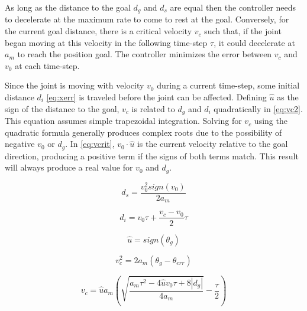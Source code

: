 As long as the distance to the goal $d_g$ and $d_s$ are equal 
then the controller needs to decelerate at the maximum rate to come to rest at the goal.
Conversely, for the current goal distance, there is a critical velocity $v_c$
such that, if the joint began moving at this velocity in the following
time-step $\tau$, it could decelerate at $a_m$ to reach the position goal.
The controller minimizes the error between $v_c$ and $v_0$ at each time-step.

Since the joint is moving with velocity $v_0$ during a current time-step, some
initial distance $d_{i}$ \eqref{eq:xerr} is traveled before the joint can be
affected. Defining $\hat{u}$ as the sign of the distance to the goal, $v_c$ is
related to $d_g$ and $d_i$ quadratically in \eqref{eq:vc2}. This equation
assumes simple trapezoidal integration. Solving for $v_c$ using the quadratic
formula generally produces complex roots due to the possibility of negative
$v_0$ or $d_g$.  In \eqref{eq:vcrit}, $v_0\cdot\hat{u}$ is the current velocity
relative to the goal direction, producing a positive term if the signs of both
terms match. This result will always produce a real value for $v_0$ and $d_g$.

\begin{equation}
\label{eq:decdist}
d_s=\frac{v_0^2 sign(v_0)}{2 a_m}
\end{equation}

\begin{equation}
\label{eq:xerr}
d_{i}=v_0 \tau + \frac{v_c-v_0}{2}\tau
\end{equation}

\begin{equation}
\label{eq:uhat}
\hat{u}=sign(\theta_g)
\end{equation}


\begin{equation}
\label{eq:vc2}
v_c^2 = 2 a_m \left(\theta_g -\theta_{err} \right)
\end{equation}

\begin{equation}
\label{eq:vcrit}
v_c=\hat{u} a_m \left(\sqrt{\frac{a_m \tau^2 - 4 \hat{u} v_0 \tau+8 |d_g|}{4 a_m}} - \frac{ \tau }{2}\right)
\end{equation}
